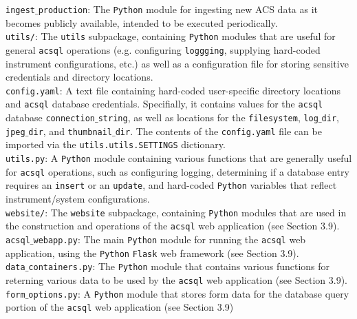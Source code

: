 \documentclass[10pt,journal,compsoc]{IEEEtran}
\begin{document}
\noindent\texttt{ingest$\_$production}: The \texttt{Python} module for ingesting new ACS data as it becomes publicly available, intended
to be executed periodically.\\

\noindent\texttt{utils/}: The \texttt{utils} subpackage, containing \texttt{Python} modules that are useful for general \texttt{acsql}
operations (e.g. configuring \texttt{loggging}, supplying hard-coded instrument configurations, etc.) as well as a configuration file
for storing sensitive credentials and directory locations.\\

\noindent\texttt{config.yaml}: A text file containing hard-coded user-specific directory locations and \texttt{acsql} database
credentials.  Specifially, it contains values for the \texttt{acsql} database \texttt{connection$\_$string}, as well as locations for
the \texttt{filesystem}, \texttt{log$\_$dir}, \texttt{jpeg$\_$dir}, and \texttt{thumbnail$\_$dir}.  The contents of the \texttt{config.yaml}
file can be imported via the \texttt{utils.utils.SETTINGS} dictionary.\\

\noindent\texttt{utils.py}: A \texttt{Python} module containing various functions that are generally useful for \texttt{acsql} operations,
such as configuring logging, determining if a database entry requires an \texttt{insert} or an \texttt{update}, and hard-coded \texttt{Python}
variables that reflect instrument/system configurations.\\

\noindent\texttt{website/}: The \texttt{website} subpackage, containing \texttt{Python} modules that are used in the construction and
operations of the \texttt{acsql} web application (see Section 3.9).\\

\noindent\texttt{acsql$\_$webapp.py}: The main \texttt{Python} module for running the \texttt{acsql} web application, using the \texttt{Python}
\texttt{Flask} web framework (see Section 3.9).\\

\noindent\texttt{data$\_$containers.py}: The \texttt{Python} module that contains various functions for reterning various data to be used
by the \texttt{acsql} web application (see Section 3.9).\\

\noindent\texttt{form$\_$options.py}: A \texttt{Python} module that stores form data for the database query portion of the \texttt{acsql}
web application (see Section 3.9)\\
\end{document}

